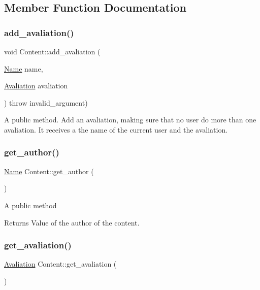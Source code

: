 \subsection{Member Function Documentation}
\mbox{\label{class_content_a8dfaac49e63b4142dd68b30564838adf}} 
\subsubsection{\texorpdfstring{add\+\_\+avaliation()}{add\_avaliation()}}
{\footnotesize\ttfamily void Content\+::add\+\_\+avaliation (\begin{DoxyParamCaption}\item[{\hyperlink{class_name}{Name}}]{name,  }\item[{\hyperlink{class_avaliation}{Avaliation}}]{avaliation }\end{DoxyParamCaption}) throw  invalid\+\_\+argument) }

A public method. Add an avaliation, making sure that no user do more than one avaliation. It receives a the name of the current user and the avaliation. \mbox{\label{class_content_a422f6d0fa9bbc258b4f2d2c32e825f73}} 
\subsubsection{\texorpdfstring{get\+\_\+author()}{get\_author()}}
{\footnotesize\ttfamily \hyperlink{class_name}{Name} Content\+::get\+\_\+author (\begin{DoxyParamCaption}{ }\end{DoxyParamCaption})}

A public method \begin{DoxyReturn}{Returns}
Value of the author of the content. 
\end{DoxyReturn}
\mbox{\label{class_content_a82ec2dba39b5d5ac82ba3081e3a71548}} 
\subsubsection{\texorpdfstring{get\+\_\+avaliation()}{get\_avaliation()}}
{\footnotesize\ttfamily \hyperlink{class_avaliation}{Avaliation} Content\+::get\+\_\+avaliation (\begin{DoxyParamCaption}{ }\end{DoxyParamCaption})}


